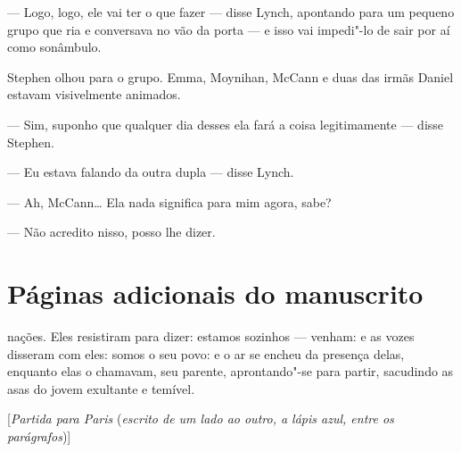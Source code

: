 --- Logo, logo, ele vai ter o que fazer --- disse Lynch, apontando
para um pequeno grupo que ria e conversava no vão da porta --- e isso
vai impedi"-lo de sair por aí como sonâmbulo.

Stephen olhou para o grupo.  Emma, Moynihan, McCann e duas das irmãs
Daniel estavam visivelmente animados.

--- Sim, suponho que qualquer dia desses ela fará a coisa
legitimamente --- disse Stephen.

--- Eu estava falando da outra dupla --- disse Lynch.

\clearpage

--- Ah, McCann\ldots{}  Ela nada significa para mim agora, sabe?

--- Não acredito nisso, posso lhe dizer.


\bigskip

{
\par}


\chapter{Páginas adicionais do manuscrito}

{
\par}


\bigskip

\noindent nações.  Eles resistiram para dizer: estamos sozinhos --- venham: e as
vozes disseram com eles: somos o seu povo: e o ar se encheu da presença
delas, enquanto elas o chamavam, seu parente, aprontando"-se para
partir, sacudindo as asas do jovem exultante e temível.


\bigskip

[\textit{Partida para Paris} (\textit{escrito de um lado ao outro, a
lápis azul, entre os parágrafos})]


\bigskip

